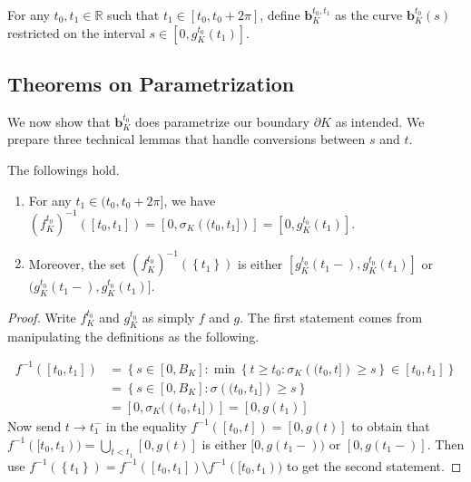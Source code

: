 \begin{definition}

For any \(t_0, t_1 \in \mathbb{R}\) such that \(t_1 \in [t_0, t_0 + 2 \pi]\), define \(\mathbf{b}_{K}^{t_0, t_1}\) as the curve \(\mathbf{b}_{K}^{t_0} (s)\) restricted on the interval \(s \in [0, g_{K}^{t_0}(t_1)]\).

\label{def:boundary-segment-parametrization}
\end{definition}

\subsection{Theorems on Parametrization}

We now show that \(\mathbf{b}_K^{t_0}\) does parametrize our boundary \(\partial K\) as intended. We prepare three technical lemmas that handle conversions between \(s\) and \(t\).

\begin{lemma}

The followings hold.

\begin{enumerate}
\def\labelenumi{\arabic{enumi}.}
\tightlist
\item
  For any \(t_1 \in (t_0, t_0 + 2\pi]\), we have \(\left(f_{K}^{t_0}\right)^{-1}([t_0, t_1]) = [0, \sigma_K\left( (t_0, t_1] \right)] = [0, g_{K}^{t_0}(t_1)]\).
\item
  Moreover, the set \(\left( f_{K}^{t_0} \right)^{-1} (\left\{ t_1 \right\})\) is either \([g_{K}^{t_0}(t_1-), g_{K}^{t_0}(t_1)]\) or \((g_{K}^{t_0}(t_1-), g_{K}^{t_0}(t_1)]\).
\end{enumerate}

\label{lem:parametrization-set-calculation}
\end{lemma}

\begin{proof}
Write \(f_K^{t_0}\) and \(g_K^{t_0}\) as simply \(f\) and \(g\). The first statement comes from manipulating the definitions as the following.

\begin{align*}
f^{-1}([t_0, t_1]) & = \left\{ s \in [0, B_K] : \min \left\{ t \geq t_0 : \sigma_K\left( (t_0, t] \right) \geq s \right\} \in [t_0, t_1] \right\} \\
& = \left\{ s \in [0, B_K] :  \sigma\left( (t_0, t_1] \right) \geq s \right\} \\
& = [0, \sigma_K((t_0, t_1])] = [0, g(t_1)]
\end{align*}
Now send \(t \to t_1^-\) in the equality \(f^{-1}([t_0, t]) = [0, g(t)]\) to obtain that \(f^{-1}([t_0, t_1)) = \bigcup_{t < t_1} [0, g(t)]\) is either \([0, g(t_1-))\) or \([0, g(t_1-)]\). Then use \(f^{-1} (\left\{ t_1 \right\}) = f^{-1}([t_0, t_1]) \setminus f^{-1}([t_0, t_1))\) to get the second statement.
\end{proof}

